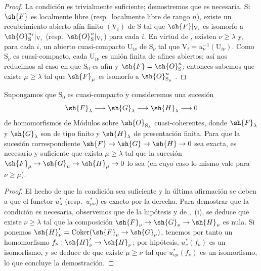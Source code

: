 \begin{proof}
La condición es trivialmente suficiente; demostremos que es necesaria.
Si $\sh{F}$ es localmente libre (resp.\ localmente libre de rango $n$), existe un recubrimiento abierto afín finito $(\mathrm{V}_i)$ de $\mathrm{S}$ tal que $\sh{F}|_{\mathrm{V}_i}$ es isomorfo a $\sh{O}_\mathrm{S}^{n_i}|_{\mathrm{V}_i}$ (resp.\ $\sh{O}_\mathrm{S}^n|_{\mathrm{V}_i}$) para cada $i$.
En virtud de , existen $\nu\geqslant\lambda$ y, para cada $i$, un abierto cuasi-compacto $\mathrm{U}_{i\nu}$ de $\mathrm{S}_\nu$ tal que $\mathrm{V}_i=u_\nu^{-1}(\mathrm{U}_{i\nu})$.
Como $\mathrm{S}_\nu$ es cuasi-compacto, cada $\mathrm{U}_{i\nu}$ es unión finita de afines abiertos; así nos reducimos al caso en que $\mathrm{S}_0$ es afín y $\sh{F}=\sh{O}_\mathrm{S}^n$; entonces sabemos que existe $\mu\geqslant\lambda$ tal que $\sh{F}_\mu$ es isomorfo a $\sh{O}_{\mathrm{S}_\mu}^n$ .
\end{proof}

\begin{proposition}[8.5.6]
\label{IV.8.5.6}
Supongamos que $\mathrm{S}_0$ es cuasi-compacto y consideremos una sucesión
\[
  \sh{F}_\lambda\to\sh{G}_\lambda\to\sh{H}_\lambda\to 0
\]
de homomorfismos de Módulos sobre $\sh{O}_{\mathrm{S}_\lambda}$ cuasi-coherentes, donde $\sh{F}_\lambda$ y $\sh{G}_\lambda$ son de tipo finito y $\sh{H}_\lambda$ de presentación finita.
Para que la sucesión correspondiente $\sh{F}\to\sh{G}\to\sh{H}\to 0$ sea exacta, es necesario y suficiente que exista $\mu\geqslant\lambda$ tal que la sucesión $\sh{F}_\mu\to\sh{G}_\mu\to\sh{H}_\mu\to 0$ lo sea (en cuyo caso lo mismo vale para $\nu\geqslant\mu$).
\end{proposition}

\begin{proof}
El hecho de que la condición sea suficiente y la última afirmación se deben a que el functor $u_\lambda^*$ (resp.\ $u_{\mu\nu}^*$) es exacto por la derecha.
Para demostrar que la condición es necesaria, observemos que de la hipótesis y de ,~(i), se deduce que existe $\nu\geqslant\lambda$ tal que la composición $\sh{F}_\nu\to\sh{G}_\nu\to\sh{H}_\nu$ es nula.
Si ponemos $\sh{H}'_\nu=\operatorname{Coker}(\sh{F}_\nu\to\sh{G}_\nu)$, tenemos por tanto un homomorfismo $f_\nu:\sh{H}'_\nu\to\sh{H}_\nu$; por hipótesis, $u_\nu^*(f_\nu)$ es un isomorfismo, y se deduce de  que existe $\mu\geqslant\nu$ tal que $u_{\nu\mu}^*(f_\nu)$ es un isomorfismo, lo que concluye la demostración.
\end{proof}

